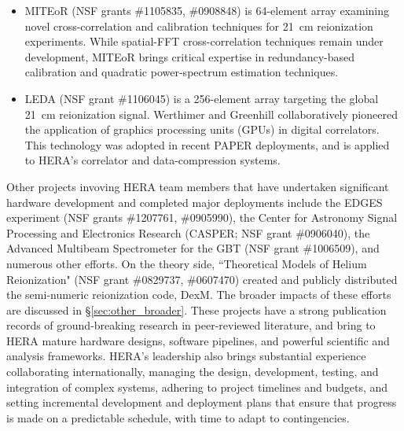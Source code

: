\documentclass[preprint]{aastex}
\begin{document}
\begin{itemize}[noitemsep,nolistsep]
\item{MITEoR} (NSF grants \#1105835, \#0908848) is 64-element array 
examining novel cross-correlation and calibration techniques for 21~cm reionization experiments.
While spatial-FFT cross-correlation
techniques remain under development, MITEoR brings critical expertise in redundancy-based calibration
and quadratic power-spectrum estimation techniques.

\item{LEDA} (NSF grant \#1106045) is a 256-element array targeting the
global 21~cm reionization signal.  Werthimer and Greenhill collaboratively 
pioneered the application of graphics processing units (GPUs) in digital correlators.
This technology was adopted in recent PAPER deployments, and is applied to HERA's correlator
and data-compression systems.

\end{itemize}

\noindent
Other projects invoving HERA team members that have undertaken significant hardware development and
completed major deployments include the EDGES experiment (NSF grants \#1207761, \#0905990),
the Center for Astronomy Signal Processing and Electronics Research (CASPER; NSF grant \#0906040), the Advanced Multibeam
Spectrometer for the GBT (NSF grant \#1006509), and numerous other efforts.  On the theory side, 
``Theoretical Models of Helium Reionization" (NSF grant \#0829737, \#0607470) 
created and publicly distributed the semi-numeric reionization code, DexM.  The broader impacts of these
efforts are discussed in \S\ref{sec:other_broader}.
These projects have a strong publication records of ground-breaking research in peer-reviewed literature, and
bring to HERA mature hardware designs, software pipelines, and powerful scientific and analysis frameworks.
HERA's leadership also brings substantial experience
collaborating internationally, managing the design, development, testing, and integration of complex systems,
adhering to project timelines and budgets, and setting incremental development and deployment plans that
ensure that progress is made on a predictable schedule, with time to adapt to contingencies.
\end{document}
